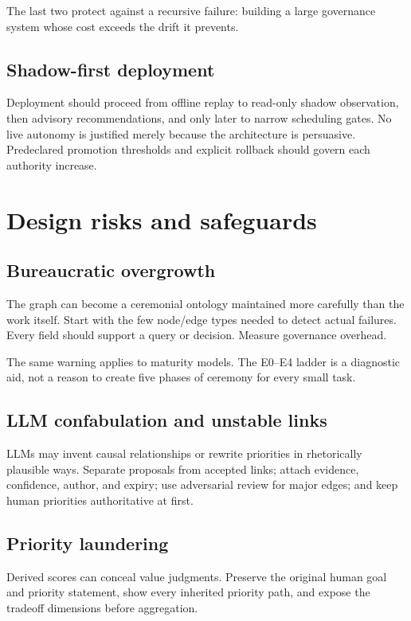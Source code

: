\documentclass[11pt,letterpaper]{article}
\begin{document}
The last two protect against a recursive failure: building a large governance
system whose cost exceeds the drift it prevents.

\subsection{Shadow-first deployment}

Deployment should proceed from offline replay to read-only shadow observation,
then advisory recommendations, and only later to narrow scheduling gates. No
live autonomy is justified merely because the architecture is persuasive.
Predeclared promotion thresholds and explicit rollback should govern each
authority increase.

\section{Design risks and safeguards}

\subsection{Bureaucratic overgrowth}

The graph can become a ceremonial ontology maintained more carefully than the
work itself. Start with the few node/edge types needed to detect actual
failures. Every field should support a query or decision. Measure governance
overhead.

The same warning applies to maturity models. The E0--E4 ladder is a diagnostic
aid, not a reason to create five phases of ceremony for every small task.

\subsection{LLM confabulation and unstable links}

LLMs may invent causal relationships or rewrite priorities in rhetorically
plausible ways. Separate proposals from accepted links; attach evidence,
confidence, author, and expiry; use adversarial review for major edges; and
keep human priorities authoritative at first.

\subsection{Priority laundering}

Derived scores can conceal value judgments. Preserve the original human goal
and priority statement, show every inherited priority path, and expose the
tradeoff dimensions before aggregation.
\end{document}
